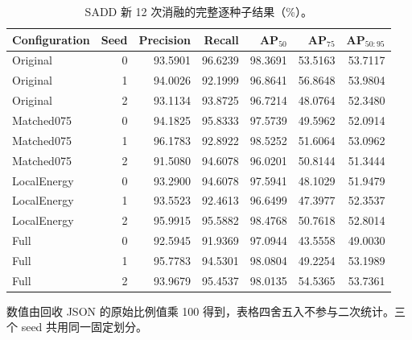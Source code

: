 \begin{table}[tp]
\centering\small
\setlength{\tabcolsep}{4pt}
\caption{SADD 新 12 次消融的完整逐种子结果（\%）。}\label{tab:sadd_individual}
\begin{tabular*}{\textwidth}{@{\extracolsep{\fill}}lrrrrrr}
\toprule
Configuration & Seed & Precision & Recall & AP$_{50}$ & AP$_{75}$ & AP$_{50:95}$\\
\midrule
Original & 0 & 93.5901 & 96.6239 & 98.3691 & 53.5163 & 53.7117 \\
Original & 1 & 94.0026 & 92.1999 & 96.8641 & 56.8648 & 53.9804 \\
Original & 2 & 93.1134 & 93.8725 & 96.7214 & 48.0764 & 52.3480 \\
\midrule
Matched075 & 0 & 94.1825 & 95.8333 & 97.5739 & 49.5962 & 52.0914 \\
Matched075 & 1 & 96.1783 & 92.8922 & 98.5252 & 51.6064 & 53.0962 \\
Matched075 & 2 & 91.5080 & 94.6078 & 96.0201 & 50.8144 & 51.3444 \\
\midrule
LocalEnergy & 0 & 93.2900 & 94.6078 & 97.5941 & 48.1029 & 51.9479 \\
LocalEnergy & 1 & 93.5523 & 92.4613 & 96.6499 & 47.3977 & 52.3537 \\
LocalEnergy & 2 & 95.9915 & 95.5882 & 98.4768 & 50.7618 & 52.8014 \\
\midrule
Full & 0 & 92.5945 & 91.9369 & 97.0944 & 43.5558 & 49.0030 \\
Full & 1 & 95.7783 & 94.5301 & 98.0804 & 49.2254 & 53.1989 \\
Full & 2 & 93.9679 & 95.4537 & 98.0135 & 54.5365 & 53.7361 \\
\bottomrule
\end{tabular*}
\smallskip
\begin{minipage}{\linewidth}\footnotesize
数值由回收 JSON 的原始比例值乘 100 得到，表格四舍五入不参与二次统计。三个 seed 共用同一固定划分。
\end{minipage}
\end{table}
